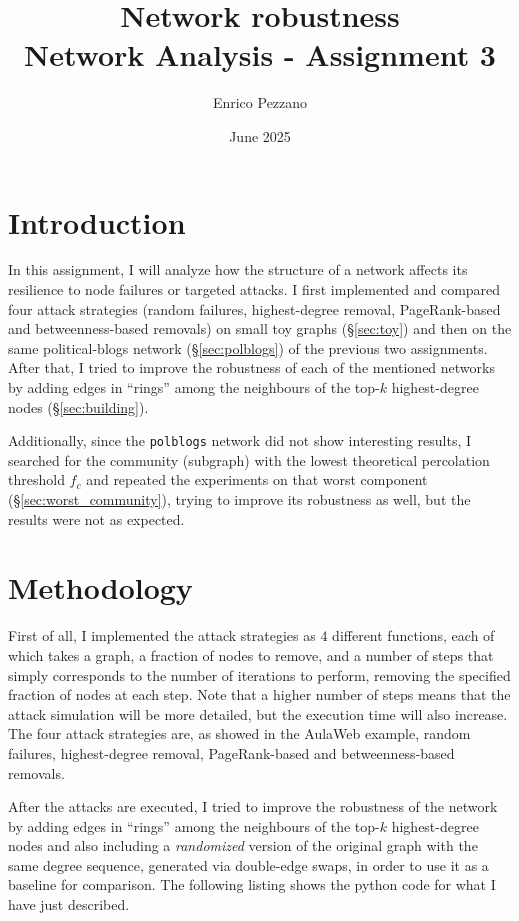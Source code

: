 \documentclass{article}
\title{\textbf{Network robustness} \\ \vspace{0.5em}
  \large Network Analysis - Assignment 3}
\author{Enrico Pezzano}
\date{June 2025}
\begin{document}
\maketitle

\section{Introduction}
In this assignment, I will analyze how the structure of a network affects its resilience to node failures or targeted attacks.
I first implemented and compared four attack strategies (random failures, highest-degree removal, PageRank-based and betweenness-based removals) on small toy graphs (\S\ref{sec:toy}) and then on the same political-blogs network (\S\ref{sec:polblogs}) of the previous two assignments.
After that, I tried to improve the robustness of each of the mentioned networks by adding edges in “rings” among the neighbours of the top-$k$ highest-degree nodes (\S\ref{sec:building}).

Additionally, since the \texttt{polblogs} network did not show interesting results, I searched for the community (subgraph) with the lowest theoretical percolation threshold $f_c$ and repeated the experiments on that worst component (\S\ref{sec:worst_community}), trying to improve its robustness as well, but the results were not as expected.


\section{Methodology}\label{sec:met}
First of all, I implemented the attack strategies as $4$ different functions, each of which takes a graph, a fraction of nodes to remove, and a number of steps that simply corresponds to the number of iterations to perform, removing the specified fraction of nodes at each step.
Note that a higher number of steps means that the attack simulation will be more detailed, but the execution time will also increase.
The four attack strategies are, as showed in the AulaWeb example, random failures, highest-degree removal, PageRank-based and betweenness-based removals.

After the attacks are executed, I tried to improve the robustness of the network by adding edges in “rings” among the neighbours of the top-$k$ highest-degree nodes and also including a \emph{randomized} version of the original graph with the same degree sequence, generated via double-edge swaps, in order to use it as a baseline for comparison.
The following listing shows the python code for what I have just described.
\end{document}
